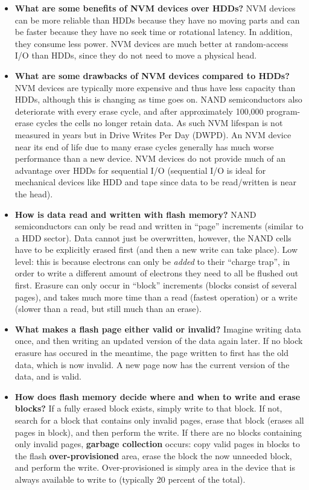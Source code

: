 \documentclass[12pt]{article}
\begin{document}
\begin{itemize}
    \item \textbf{What are some benefits of NVM devices over HDDs?} NVM devices can be more reliable than HDDs because they have no moving parts and can be faster because they have no seek time or rotational latency. In addition, they consume less power. NVM devices are much better at random-access I/O than HDDs, since they do not need to move a physical head.
    \item \textbf{What are some drawbacks of NVM devices compared to HDDs?} NVM devices are typically more expensive and thus have less capacity than HDDs, although this is changing as time goes on. NAND semiconductors also deteriorate with every erase cycle, and after approximately 100,000 program-erase cycles the cells no longer retain data. As such NVM lifespan is not measured in years but in Drive Writes Per Day (DWPD). An NVM device near its end of life due to many erase cycles generally has much worse performance than a new device. NVM devices do not provide much of an advantage over HDDs for sequential I/O (sequential I/O is ideal for mechanical devices like HDD and tape since data to be read/written is near the head).
    \item \textbf{How is data read and written with flash memory?} NAND semiconductors can only be read and written in ``page'' increments (similar to a HDD sector). Data cannot just be overwritten, however, the NAND cells have to be explicitly erased first (and then a new write can take place). Low level: this is because electrons can only be \textit{added} to their ``charge trap'', in order to write a different amount of electrons they need to all be flushed out first. Erasure can only occur in ``block'' increments (blocks consist of several pages), and takes much more time than a read (fastest operation) or a write (slower than a read, but still much than an erase).
    \item \textbf{What makes a flash page either valid or invalid?} Imagine writing data once, and then writing an updated version of the data again later. If no block erasure has occured in the meantime, the page written to first has the old data, which is now invalid. A new page now has the current version of the data, and is valid.
    \item \textbf{How does flash memory decide where and when to write and erase blocks?} If a fully erased block exists, simply write to that block. If not, search for a block that contains only invalid pages, erase that block (erases all pages in block), and then perform the write. If there are no blocks containing only invalid pages, \textbf{garbage collection} occurs: copy valid pages in blocks to the flash \textbf{over-provisioned} area, erase the block the now unneeded block, and perform the write. Over-provisioned is simply area in the device that is always available to write to (typically 20 percent of the total).

\end{itemize}
\end{document}
